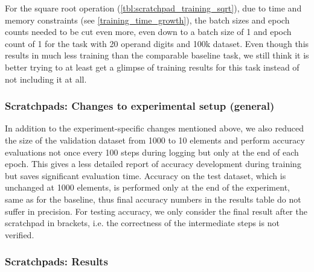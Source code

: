 For the square root operation (\cref{tbl:scratchpad_training_sqrt}), due to time and memory constraints (see \cref{training_time_growth}), the batch sizes and epoch counts needed to be cut even more, even down to a batch size of 1 and epoch count of 1 for the task with 20 operand digits and 100k dataset. Even though this results in much less training than the comparable baseline task, we still think it is better trying to at least get a glimpse of training results for this task instead of not including it at all.

\subsubsection{Scratchpads: Changes to experimental setup (general)}

In addition to the experiment-specific changes mentioned above, we also reduced the size of the validation dataset from 1000 to 10 elements and perform accuracy evaluations not once every 100 steps during logging but only at the end of each epoch. This gives a less detailed report of accuracy development during training but saves significant evaluation time. Accuracy on the test dataset, which is unchanged at 1000 elements, is performed only at the end of the experiment, same as for the baseline, thus final accuracy numbers in the results table do not suffer in precision.
For testing accuracy, we only consider the final result after the scratchpad in brackets, i.e. the correctness of the intermediate steps is not verified.

\subsubsection{Scratchpads: Results}

\begin{table}[H]
	\begin{minipage}[t]{0.47\linewidth}
		\hfill
		\label{tbl:scratchpad_add}
	\end{minipage}
	\hfill %
	\begin{minipage}[t]{0.47\linewidth}
		\hfill
		\label{tbl:scratchpad_add_baseline}
	\end{minipage}
\end{table}

